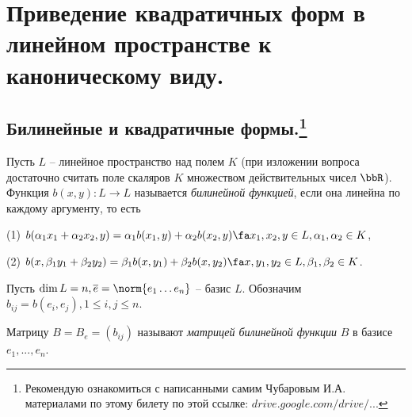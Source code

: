 \chapter{Приведение квадратичных форм в линейном пространстве к каноническому виду.}

\section[Билинейные и квадратичные формы.]{Билинейные и квадратичные формы.\footnote{Рекомендую ознакомиться с написанными самим Чубаровым И.А. материалами по этому билету по этой ссылке: \href{https://drive.google.com/drive/u/0/folders/0BzuzEyNkpwYDYjVNcE0wa3hqWjA}{$drive.google.com/drive/...$}}}
  \begin{defn}  
  Пусть $L$ -- линейное пространство над полем $K$ (при изложении вопроса достаточно считать поле скаляров $K$ множеством действительных чисел $\bbR$). 
Функция $b(x,y): L\rightarrow L$ называется \textit{билинейной функцией}, если она линейна по каждому аргументу, то есть

(1) $b(\alpha_1 x_1+\alpha_2 x_2,y)=\alpha_1 b(x_1,y)+\alpha_2 b(x_2,y) \fa x_1,x_2,y \in L, \alpha_1,\alpha_2 \in K$,

(2) $b(x,\beta_1 y_1+\beta_2 y_2)=\beta_1 b(x,y_1)+\beta_2 b(x,y_2)  \fa x,y_1,y_2 \in L, \beta_1,\beta_2 \in K$.
  \end{defn}
  Пусть $\dim L=n, \overline{e}=\norm{e_1 \ldots e_n}$ -- базис $L$. Обозначим $b_{ij}=b(e_i,e_j), 1\le i,j \le n$.
  \begin{defn}
  Матрицу $B=B_e=(b_{ij})$ называют \textit{матрицей билинейной 	функции} $B$ в базисе $e_1,...,e_n$.
  \end{defn}
  
